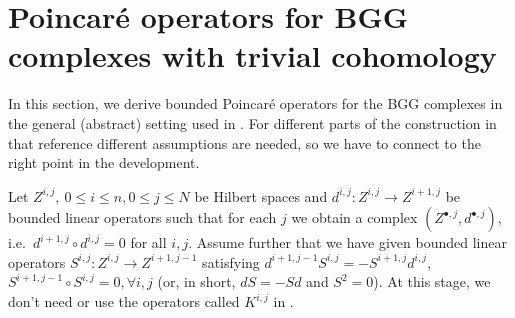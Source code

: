 \documentclass[11pt]{amsart}
\newcommand{\0}{\mathaccent23}
\newcommand{\bs}{{\scriptscriptstyle \bullet}}
\begin{document}
 
 

\section{Poincar\'e operators for BGG complexes with trivial cohomology}\label{sec:construction}

In this section, we derive bounded Poincar\'e operators for the BGG complexes in the general (abstract) setting used in  \cite{vcap2022bgg}. For different parts of the construction in that reference different assumptions are needed, so we have to connect to the right point in the development. 

Let $Z^{i, j}, ~0\leq i\leq n, 0\leq j\leq N$ be Hilbert spaces and $d^{i, j}: Z^{i, j}\to Z^{i+1, j}$ be bounded linear operators such that for each $j$ we obtain a complex $(Z^{\bs,j},d^{\bs,j})$, i.e.~$d^{i+1,j}\circ d^{i,j}=0$ for all $i,j$. Assume further that we have given bounded linear operators $S^{i, j}: Z^{i, j}\to Z^{i+1, j-1}$ satisfying $d^{i+1, j-1}S^{i, j}=-S^{i+1, j}d^{i, j}$, $S^{i+1, j-1}\circ S^{i, j}=0, \forall i, j$ (or, in short,  $dS=-Sd$ and $S^{2}=0$). At this stage, we don't need or use the operators called $K^{i,j}$ in \cite{vcap2022bgg}.
\end{document}
